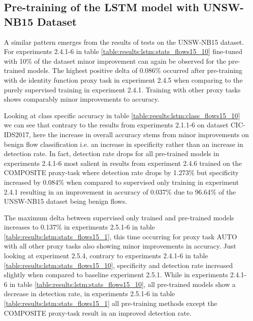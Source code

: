 \FloatBarrier

\clearpage

\subsection{Pre-training of the LSTM model with UNSW-NB15 Dataset}

A similar pattern emerges from the results of tests on the UNSW-NB15 dataset. For experiments 2.4.1-6 in table \ref{table:results:lstm:stats_flows15_10} fine-tuned with 10\% of the dataset minor improvement can again be observed for the pre-trained models. The highest positive delta of 0.086\% occurred after pre-training with de identity function proxy task in experiment 2.4.5 when comparing to the purely supervised training in experiment 2.4.1. Training with other proxy tasks shows comparably minor improvements to accuracy. \par






Looking at class specific accuracy in table \ref{table:results:lstm:class_flows15_10} we can see that contrary to the results from experiments 2.1.1-6 on dataset CIC-IDS2017, here the increase in overall accuracy stems from minor improvements on benign flow classification i.e. an increase in specificity rather than an increase in detection rate. In fact, detection rate drops for all pre-trained models in experiments 2.4.1-6 most salient in results from experiment 2.4.6 trained on the COMPOSITE proxy-task where detection rate drops by 1.273\% but specificity increased by 0.084\% when compared to supervised only training in experiment 2.4.1 resulting in an improvement in accuracy of 0.037\% due to 96.64\% of the UNSW-NB15 dataset being benign flows. \par





The maximum delta between supervised only trained and pre-trained models increases to 0.137\% in experiments 2.5.1-6 in table \ref{table:results:lstm:stats_flows15_1}, this time occurring for proxy task AUTO with all other proxy tasks also showing minor improvements in accuracy. Just looking at experiment 2.5.4, contrary to experiments 2.4.1-6 in table  \ref{table:results:lstm:stats_flows15_10}, specificity and detection rate increased slightly when compared to baseline experiment 2.5.1. While in experiments 2.4.1-6 in table \ref{table:results:lstm:stats_flows15_10}, all pre-trained models show a decrease in detection rate, in experiments 2.5.1-6 in table  \ref{table:results:lstm:stats_flows15_1} all pre-training methods except the COMPOSITE proxy-task result in an improved detection rate. \par

